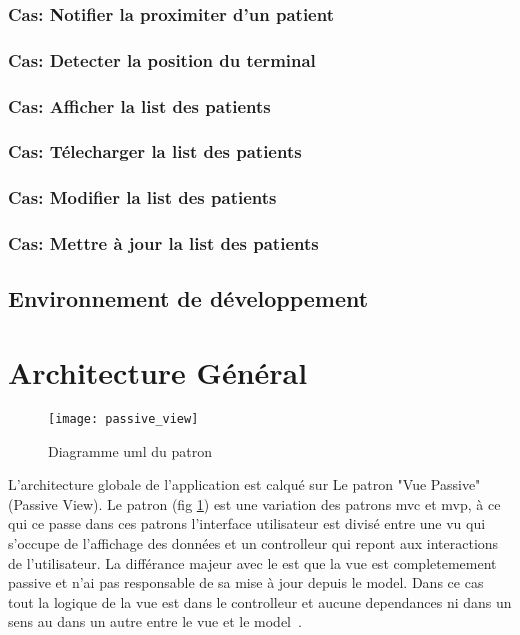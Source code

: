 \subsubsection{Cas: Notifier la proximiter d'un patient}
\subsubsection{Cas: Detecter la position du terminal}
\subsubsection{Cas: Afficher la list des patients}
\subsubsection{Cas: Télecharger la list des patients}
\subsubsection{Cas: Modifier la list des patients}
\subsubsection{Cas: Mettre à jour la list des patients}

\subsection{Environnement de développement}%

\section{Architecture Général}

\begin{figure}
\center
\texttt{[image: passive\_view]}
\caption{Diagramme \gls{uml} du patron ~\cite{fowler:passive_view}}
\label{fig:passive_view}
\end{figure}

L'architecture globale de l'application est calqué sur Le patron "Vue
Passive" (Passive View). Le patron  (fig
\ref{fig:passive_view}) est une variation des patrons \gls{mvc} et
\gls{mvp}, à ce qui ce passe dans ces patrons l'interface utilisateur
est divisé entre une vu qui s'occupe de l'affichage des données et un
controlleur qui repont aux interactions de l'utilisateur. La différance
majeur avec le  est que la vue est completemement
passive et n'ai pas responsable de sa mise à jour depuis le model. Dans
ce cas tout la logique de la vue est dans le controlleur et aucune
dependances ni dans un sens au dans un autre entre le vue et le
model~\cite{fowler:passive_view}.

